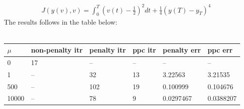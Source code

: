 \documentclass[11pt,a4paper]{article}
\begin{document}
\begin{align*}
J(y(v),v)=\int_0^T (v(t)-\frac{1}{2})^2 dt + \frac{1}{4}(y(T)-y_T)^4
\end{align*}  
The results follows in the table below:
\\
\\
\begin{tabular}{llllll}
\toprule
{} $\mu$& non-penalty itr & penalty itr & ppc itr & penalty err &    ppc err \\
\midrule
0     &              17 &          -- &      -- &          -- &         -- \\
1     &              -- &          32 &      13 &     3.22563 &    3.21535 \\
500   &              -- &         102 &      19 &    0.100999 &   0.104676 \\
10000 &              -- &          78 &       9 &   0.0297467 &  0.0388207 \\
\bottomrule
\end{tabular}


\end{document}
